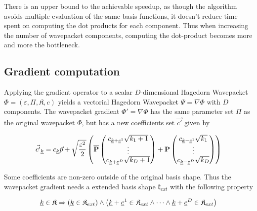 \documentclass{article}
\begin{document}
There is an upper bound to the achievable speedup, as though the algorithm
avoids multiple evaluation of the same basis functions, it doesn't reduce
time spent on computing the dot products for each component.
Thus when increasing the number of wavepacket components, computing the dot-product becomes
more and more the bottleneck.

\subsection{Gradient computation}
Applying the gradient operator to a scalar \(D\)-dimensional Hagedorn Wave\-packet
\( \Phi = \left( \varepsilon, \Pi, \mathfrak{K}, c \right)\)
yields a vectorial Hagedorn Wavepacket \(\Psi=\nabla\Phi\) with \(D\) components.
The wavepacket gradient \(\Phi' = \nabla \Phi\) has the same parameter set \(\Pi\)
as the original wavepacket \(\Phi\), but has a new coefficients set \(\vec{c'}\) given by

\begin{equation}
  \label{eq:compute_grad_coeff}
  \vec{c'}_{\underline{k}}=c_{\underline{k}}\vec{p}+\sqrt{\frac{\varepsilon^2}{2}}
  \left(\mathbf{\overline{P}}
    \begin{pmatrix}
      c_{\underline{k}+\underline{e}^1}\sqrt{k_1+1} \\
      \vdots \\
      c_{\underline{k}+\underline{e}^D}\sqrt{k_D+1} \\
    \end{pmatrix}
    +\mathbf{P}
    \begin{pmatrix}
      c_{\underline{k}-\underline{e}^1}\sqrt{k_1} \\
      \vdots \\
      c_{\underline{k}-\underline{e}^D}\sqrt{k_D} \\
    \end{pmatrix}
  \right)
\end{equation}

Some coefficients are non-zero outside of the original basis shape.
Thus the wavepacket gradient needs a extended basis shape \(\mathfrak{k}_{ext}\)
with the following property

\begin{equation}
  \label{eq:shape_extension_requirement}
  \underline{k} \in \mathfrak{K} \Rightarrow
  \left(
     \underline{k} \in \mathfrak{K}_{ext}
  \right)
  \wedge
  \left(
    \underline{k}+\underline{e}^1 \in \mathfrak{K}_{ext}
    \wedge \dots \wedge
    \underline{k}+\underline{e}^D \in \mathfrak{K}_{ext}
  \right)
\end{equation}
\end{document}
